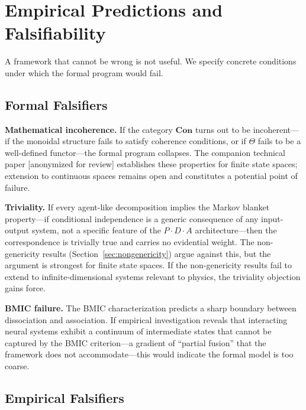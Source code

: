 \documentclass[11pt,a4paper]{article}
\theoremstyle{definition}
\theoremstyle{plain}
\theoremstyle{remark}
\newcommand{\Con}{\mathbf{Con}}
\begin{document}
\section{Empirical Predictions and Falsifiability}\label{sec:predictions}

A framework that cannot be wrong is not useful. We specify concrete conditions under which the formal program would fail.

\subsection{Formal Falsifiers}\label{sec:formal-falsifiers}

\textbf{Mathematical incoherence.} If the category $\Con$ turns out to be incoherent---if the monoidal structure fails to satisfy coherence conditions, or if $\Theta$ fails to be a well-defined functor---the formal program collapses. The companion technical paper [anonymized for review] establishes these properties for finite state spaces; extension to continuous spaces remains open and constitutes a potential point of failure.

\textbf{Triviality.} If every agent-like decomposition implies the Markov blanket property---if conditional independence is a generic consequence of any input-output system, not a specific feature of the $P \cdot D \cdot A$ architecture---then the correspondence is trivially true and carries no evidential weight. The non-genericity results (Section~\ref{sec:nongenericity}) argue against this, but the argument is strongest for finite state spaces. If the non-genericity results fail to extend to infinite-dimensional systems relevant to physics, the triviality objection gains force.

\textbf{BMIC failure.} The BMIC characterization predicts a sharp boundary between dissociation and association. If empirical investigation reveals that interacting neural systems exhibit a continuum of intermediate states that cannot be captured by the BMIC criterion---a gradient of ``partial fusion'' that the framework does not accommodate---this would indicate the formal model is too coarse.

\subsection{Empirical Falsifiers}\label{sec:empirical-falsifiers}
\end{document}
